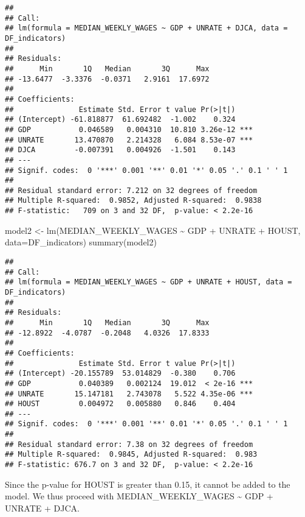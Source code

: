 \documentclass[
]{article}
\newenvironment{Shaded}{\begin{snugshade}}{\end{snugshade}}
\newcommand{\AttributeTok}[1]{\textcolor[rgb]{0.77,0.63,0.00}{#1}}
\newcommand{\FunctionTok}[1]{\textcolor[rgb]{0.00,0.00,0.00}{#1}}
\newcommand{\NormalTok}[1]{#1}
\newcommand{\OtherTok}[1]{\textcolor[rgb]{0.56,0.35,0.01}{#1}}
\newcommand{\SpecialCharTok}[1]{\textcolor[rgb]{0.00,0.00,0.00}{#1}}
\begin{document}
\begin{verbatim}
## 
## Call:
## lm(formula = MEDIAN_WEEKLY_WAGES ~ GDP + UNRATE + DJCA, data = DF_indicators)
## 
## Residuals:
##      Min       1Q   Median       3Q      Max 
## -13.6477  -3.3376  -0.0371   2.9161  17.6972 
## 
## Coefficients:
##               Estimate Std. Error t value Pr(>|t|)    
## (Intercept) -61.818877  61.692482  -1.002    0.324    
## GDP           0.046589   0.004310  10.810 3.26e-12 ***
## UNRATE       13.470870   2.214328   6.084 8.53e-07 ***
## DJCA         -0.007391   0.004926  -1.501    0.143    
## ---
## Signif. codes:  0 '***' 0.001 '**' 0.01 '*' 0.05 '.' 0.1 ' ' 1
## 
## Residual standard error: 7.212 on 32 degrees of freedom
## Multiple R-squared:  0.9852, Adjusted R-squared:  0.9838 
## F-statistic:   709 on 3 and 32 DF,  p-value: < 2.2e-16
\end{verbatim}

\begin{Shaded}
\begin{Highlighting}[]
\NormalTok{model2 }\OtherTok{\textless{}{-}} \FunctionTok{lm}\NormalTok{(MEDIAN\_WEEKLY\_WAGES }\SpecialCharTok{\textasciitilde{}}\NormalTok{ GDP }\SpecialCharTok{+}\NormalTok{ UNRATE }\SpecialCharTok{+}\NormalTok{ HOUST, }\AttributeTok{data=}\NormalTok{DF\_indicators)}
\FunctionTok{summary}\NormalTok{(model2)}
\end{Highlighting}
\end{Shaded}

\begin{verbatim}
## 
## Call:
## lm(formula = MEDIAN_WEEKLY_WAGES ~ GDP + UNRATE + HOUST, data = DF_indicators)
## 
## Residuals:
##      Min       1Q   Median       3Q      Max 
## -12.8922  -4.0787  -0.2048   4.0326  17.8333 
## 
## Coefficients:
##               Estimate Std. Error t value Pr(>|t|)    
## (Intercept) -20.155789  53.014829  -0.380    0.706    
## GDP           0.040389   0.002124  19.012  < 2e-16 ***
## UNRATE       15.147181   2.743078   5.522 4.35e-06 ***
## HOUST         0.004972   0.005880   0.846    0.404    
## ---
## Signif. codes:  0 '***' 0.001 '**' 0.01 '*' 0.05 '.' 0.1 ' ' 1
## 
## Residual standard error: 7.38 on 32 degrees of freedom
## Multiple R-squared:  0.9845, Adjusted R-squared:  0.983 
## F-statistic: 676.7 on 3 and 32 DF,  p-value: < 2.2e-16
\end{verbatim}

Since the p-value for HOUST is greater than 0.15, it cannot be added to
the model. We thus proceed with MEDIAN\_WEEKLY\_WAGES \textasciitilde{}
GDP + UNRATE + DJCA.
\end{document}
